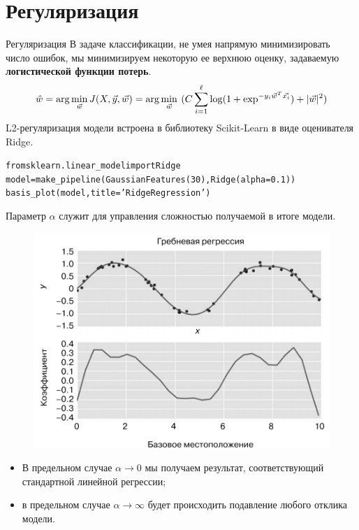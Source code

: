 \documentclass{beamer}
\begin{document}
\section{Регуляризация}

\begin{frame}[fragile]{Регуляризация}
В задаче классификации, не умея напрямую минимизировать число ошибок, мы минимизируем некоторую ее верхнюю оценку, задаваемую \textbf{логистической функции потерь}.
\[\large \hat{w} = \arg \min_{\vec{w}} J(X, \vec{y}, \vec{w}) = \arg \min_{\vec{w}}\ (C\sum_{i=1}^{\ell} \log (1 + \exp^{-y_i\vec{w}^T\vec{x_i}})+ |\vec{w}|^2)\]
L2-регуляризация модели встроена в библиотеку Scikit-Learn в виде оценивателя Ridge.
\begin{alltt}
from sklearn.linear_model import Ridge
model = make_pipeline(GaussianFeatures(30), Ridge(alpha=0.1))
basis_plot(model, title='Ridge Regression')
\end{alltt}
\end{frame}

\begin{frame}[fragile]
Параметр $\alpha$ служит для управления сложностью получаемой в итоге модели.
\begin{figure}[h]
\centering
\includegraphics[scale=0.5]{images/logistic.png}
\end{figure}
\begin{itemize}
\item В предельном случае $\alpha \rightarrow 0$ мы получаем результат, соответствующий стандартной линейной регрессии; 
\item в предельном случае $\alpha \rightarrow \infty$ будет происходить подавление любого отклика модели. 
\end{itemize}
\end{frame}
\end{document}
